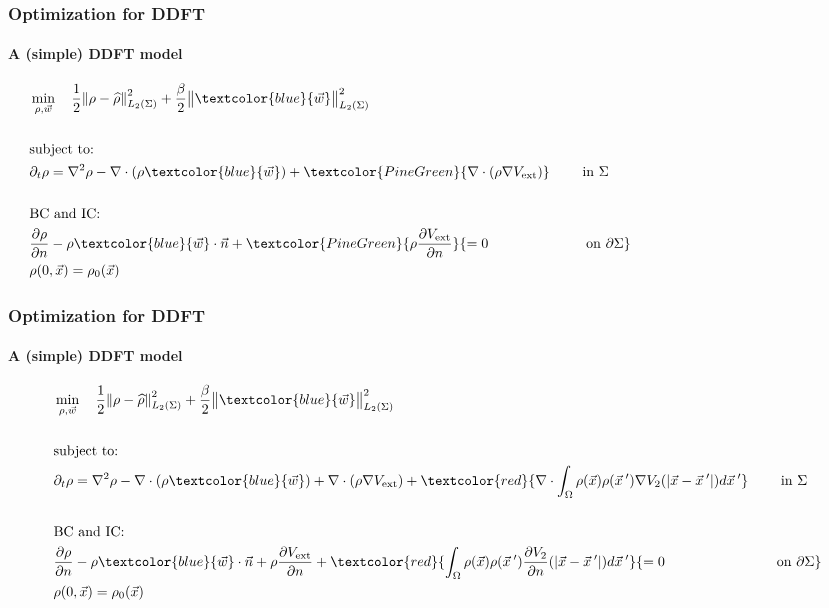 \documentclass[aspectratio=169,xcolor=dvipsnames]{beamer}
\begin{document}
\begin{frame}
	\frametitle{Optimization for DDFT}
	\framesubtitle{A (simple) DDFT model}
	\begin{align*}
		&\min_{\rho,\vec{w}} \quad \frac{1}{2}\norm{\rho- \widehat{\rho}}_{L_2(\Sigma)}^2 + \frac{\beta}{2} \norm{ \textcolor{blue}{\vec{w}}}_{L_2(\Sigma)}^2\\
		\\
		&\text{subject to:}
		\\
		& \partial_t \rho = \nabla^2 \rho - \nabla \cdot (\rho  \textcolor{blue}{\vec{w}}) + \textcolor{PineGreen}{\nabla \cdot \left(\rho \nabla V_{\text{ext}} \right)}  \qquad \ { \text{in    } \Sigma}\qquad \qquad \qquad\qquad \qquad \qquad\qquad \qquad \quad\\
		\\
		&{\text{BC } \text{and IC:}}\\
		&\frac{\partial \rho}{\partial n} - \rho  \textcolor{blue}{\vec{w}} \cdot \vec{n}  + \textcolor{PineGreen}{\rho \frac{\partial V_{\text{ext}}}{\partial n}} {= 0 \quad \quad \qquad \qquad \quad \text{on   } \partial \Sigma  } \qquad \qquad \qquad \qquad \\
		&{\rho(0,\vec{x}) = \rho_0(\vec{x})} 
	\end{align*}
	
\end{frame}
\begin{frame}
	\frametitle{Optimization for DDFT}
	\framesubtitle{A (simple) DDFT model}
	\begin{align*}
		&\min_{\rho,\vec{w}} \quad \frac{1}{2}\norm{\rho- \widehat{\rho}}_{L_2(\Sigma)}^2 + \frac{\beta}{2} \norm{ \textcolor{blue}{\vec{w}}}_{L_2(\Sigma)}^2\\
		\\
		&\text{subject to:}
		\\
		& \partial_t \rho = \nabla^2 \rho - \nabla \cdot (\rho  \textcolor{blue}{\vec{w}}) + \nabla \cdot \left(\rho \nabla V_{\text{ext}} \right) + \textcolor{red}{\nabla \cdot \int_\Omega \rho(\vec{x}) \rho(\vec{x}\hspace{0.2em}') \nabla V_2(|\vec{x}-\vec{x}\hspace{0.2em}'|)d\vec{x}\hspace{0.2em}'} \qquad \ { \text{in    } \Sigma}\\
		\\
		&{\text{BC } \text{and IC:}}\\
		&\frac{\partial \rho}{\partial n} - \rho  \textcolor{blue}{\vec{w}} \cdot \vec{n}  + \rho \frac{\partial V_{\text{ext}}}{\partial n} + \textcolor{red}{ \int_\Omega \rho(\vec{x}) \rho(\vec{x}\hspace{0.2em}')  \frac{ \partial  V_2}{\partial n}(|\vec{x}-\vec{x}\hspace{0.2em}'|)d\vec{x}\hspace{0.2em}'} {= 0 \quad \ \ \ \quad \qquad \qquad \quad \text{on   } \partial \Sigma  } \\
		&{\rho(0,\vec{x}) = \rho_0(\vec{x})} 
	\end{align*}
	
\end{frame}
\end{document}
